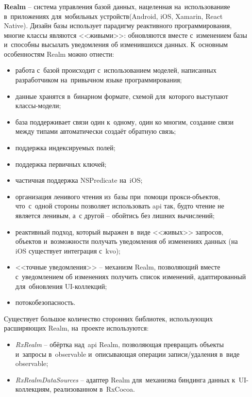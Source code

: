 \subsubsection{}
\label{sec:development:arch:ios:realm}

\textbf{Realm} -- система управления базой данных, нацеленная на~использованияе в~приложениях для~мобильных устройств(Android, iOS, Xamarin, React Native). Дизайн базы использует парадигму реактивного программирования, многие классы являются <<живыми>>: обновляются вместе с~изменением базы и~способны высылать уведомления об изменившихся данных. К~основным особенностям Realm можно отнести:

\begin{itemize}
	\item работа с~базой происходит с~использованием моделей, написанных разработчиком на~привычном языке программирования;
	\item данные хранятся в~бинарном формате, схемой для~которого выступают классы-модели;
	\item база поддерживает связи один к~одному, один ко многим, создание связи между типами автоматически создаёт обратную связь;
	\item поддержка индексируемых полей;
	\item поддержка первичных ключей;
	\item частичная поддержка NSPredicate на~iOS;
	\item организация ленивого чтения из~базы при~помощи прокси-объектов, что~с~одной стороны позволяет использовать \gls{api} так, будто чтение не является ленивым, а~с другой -- обойтись без лишних вычислений;
	\item реактивный подход, который выражен в~виде <<живых>> запросов, объектов и~возможности получать уведомления об изменениях данных (на iOS существует интеграция с~\gls{kvo});
	\item <<точные уведомления>> -- механизм Realm, позволяющий вместе с~уведомлением об изменениях получить список изменений, адаптированный для~обновления UI-коллекций;
	\item потокобезопасность.
\end{itemize}

Существует большое количество сторонних библиотек, использующих расширяющих Realm, на~проекте используются:

\begin{itemize}
	\item \emph{RxRealm} -- обёртка над~\gls{api} Realm, позволяющая превращать объекты и~запросы в~\gls{observable} и~описывающая операции записи/удаления в~виде \gls{observable};
	\item \emph{RxRealmDataSources} -- адаптер Realm для~механизма биндинга данных к~UI-коллекциям, реализованном в~RxCocoa.
\end{itemize}